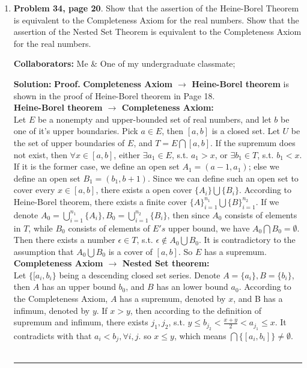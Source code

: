 \documentclass{article}%
\newenvironment{proof}[1][Proof]{\textbf{#1.} }{\ \rule{0.5em}{0.5em}}
\begin{document}
\begin{enumerate}
\item \textbf{Problem 34, page 20}.  Show that the assertion of the Heine-Borel Theorem is equivalent to the Completeness Axiom for the real numbers.  Show that the assertion of the Nested Set Theorem is equivalent to the Completeness Axiom for the real numbers.

\bigskip
\textbf{Collaborators:} Me \& One of my undergraduate classmate;
\smallskip
 
\textbf{Solution:}
\begin{proof}
\textbf{Completeness Axiom $\to$ Heine-Borel theorem} is shown in the proof of Heine-Borel theorem in Page 18.
\\
\textbf{Heine-Borel theorem $\to$ Completeness Axiom:} \\
Let $E$ be a nonempty and upper-bounded set of real numbers, and let $b$ be one of it's upper boundaries. Pick $a\in E$, then $[a, b]$ is a closed set. Let $U$ be the set of upper boundaries of $E$, and $T = E\bigcap [a, b]$. If the supremum does not exist, then $\forall x\in[a, b]$, either $\exists a_1\in E$, s.t. $a_1 > x$, or $\exists b_1\in T$, s.t. $b_1 < x$. If it is the former case, we define an open set $A_1 = (a-1, a_1)$; else we define an open set $B_1 = (b_1, b+1)$. Since we can define such an open set to cover every $x\in [a, b]$, there exists a open cover $\{A_i\}\bigcup\{B_i\}$. According to Heine-Borel theorem, there exists a finite cover $\{A\}_{i = 1}^{n_1}\bigcup\{B\}_{i = 1}^{n_2}$. If we denote $A_0 = \bigcup_{i=1}^{n_1}\{A_i\}, B_0 = \bigcup_{i=1}^{n_2}\{B_i\}$, then since $A_0$ consists of elements in $T$, while $B_0$ consists of elements of $E's$ upper bound, we have $A_0\bigcap B_0 = \emptyset$. Then there exists a number $\epsilon\in T$, s.t. $\epsilon\notin A_0\bigcup B_0$. It is contradictory to the assumption that $A_0\bigcup B_0$ is a cover of $[a, b]$. So $E$ has a supremum. \\
\textbf{Completeness Axiom $\to$ Nested Set theorem:} \\
Let $\{[a_i, b_i\}$ being a descending closed set series. Denote $A = \{a_i\}, B = \{b_i\}$, then $A$ has an upper bound $b_0$, and $B$ has an lower bound $a_0$. According to the Completeness Axiom, $A$ has a supremum, denoted by $x$, and B has a infimum, denoted by $y$. If $x > y$, then according to the definition of supremum and infimum, there exists $j_1, j_2$, s.t. $y \le b_{j_2} < \frac{x+y}{2} < a_{j_1} \le x$. It contradicts with that $a_i < b_j, \forall i, j$. so $x \le y$, which means $\bigcap \{[a_i, b_i]\} \ne \emptyset$. \\

\end{proof}
\end{enumerate}
\end{document}
